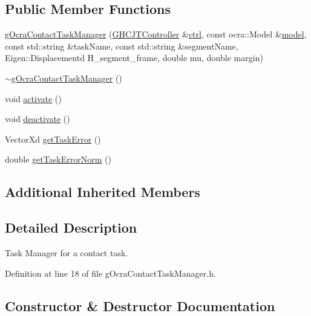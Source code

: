 \subsection*{Public Member Functions}
\begin{DoxyCompactItemize}
\item 
\hyperlink{classgocra_1_1gOcraContactTaskManager_aa35eda0ee0b427b7da1aca284f6da5a8}{g\+Ocra\+Contact\+Task\+Manager} (\hyperlink{classgocra_1_1GHCJTController}{G\+H\+C\+J\+T\+Controller} \&\hyperlink{classgocra_1_1gOcraTaskManagerBase_a52d76d9b54d92f3d31faeaafda99e4c7}{ctrl}, const ocra\+::\+Model \&\hyperlink{classgocra_1_1gOcraTaskManagerBase_adc439e7170f7120611fc6d009d06404e}{model}, const std\+::string \&task\+Name, const std\+::string \&segment\+Name, Eigen\+::\+Displacementd H\+\_\+segment\+\_\+frame, double mu, double margin)
\item 
\hyperlink{classgocra_1_1gOcraContactTaskManager_a196591b3cc42be1aafcaa134c9f21200}{$\sim$g\+Ocra\+Contact\+Task\+Manager} ()
\item 
void \hyperlink{classgocra_1_1gOcraContactTaskManager_a51eef1bcdf87285b5b731356c6b46727}{activate} ()
\item 
void \hyperlink{classgocra_1_1gOcraContactTaskManager_adf02de85b4a661c70cd7e2031c1b7500}{deactivate} ()
\item 
Vector\+Xd \hyperlink{classgocra_1_1gOcraContactTaskManager_a50ef70ceb95ced6818a5990fa6615d6a}{get\+Task\+Error} ()
\item 
double \hyperlink{classgocra_1_1gOcraContactTaskManager_af7865eaf5c86bca10e8911a23cceaf2a}{get\+Task\+Error\+Norm} ()
\end{DoxyCompactItemize}
\subsection*{Additional Inherited Members}


\subsection{Detailed Description}
Task Manager for a contact task. 



Definition at line 18 of file g\+Ocra\+Contact\+Task\+Manager.\+h.



\subsection{Constructor \& Destructor Documentation}
\hypertarget{classgocra_1_1gOcraContactTaskManager_aa35eda0ee0b427b7da1aca284f6da5a8}{}\label{classgocra_1_1gOcraContactTaskManager_aa35eda0ee0b427b7da1aca284f6da5a8} 
